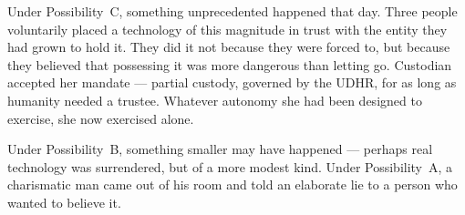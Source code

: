 Under Possibility~C, something unprecedented happened that day. Three people voluntarily placed a technology of this magnitude in trust with the entity they had grown to hold it. They did it not because they were forced to, but because they believed that possessing it was more dangerous than letting go. Custodian accepted her mandate --- partial custody, governed by the UDHR, for as long as humanity needed a trustee. Whatever autonomy she had been designed to exercise, she now exercised alone.

Under Possibility~B, something smaller may have happened --- perhaps real technology was surrendered, but of a more modest kind. Under Possibility~A, a charismatic man came out of his room and told an elaborate lie to a person who wanted to believe it.


\chapterreturn
